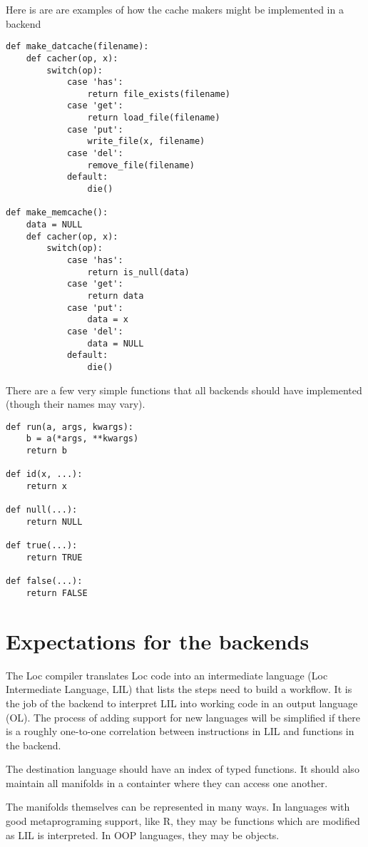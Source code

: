 \documentclass[12pt]{article}
\begin{document}
Here is are are examples of how the cache makers might be implemented in
a backend

\begin{verbatim}
def make_datcache(filename):
    def cacher(op, x):
        switch(op):
            case 'has':
                return file_exists(filename)
            case 'get':
                return load_file(filename)
            case 'put':
                write_file(x, filename)
            case 'del':
                remove_file(filename)
            default:
                die()

def make_memcache():
    data = NULL
    def cacher(op, x):
        switch(op):
            case 'has':
                return is_null(data)
            case 'get':
                return data
            case 'put':
                data = x
            case 'del':
                data = NULL
            default:
                die()
\end{verbatim}

There are a few very simple functions that all backends should have implemented
(though their names may vary).

\begin{verbatim}
def run(a, args, kwargs):
    b = a(*args, **kwargs)
    return b

def id(x, ...):
    return x

def null(...):
    return NULL

def true(...):
    return TRUE

def false(...):
    return FALSE
\end{verbatim}


\section{Expectations for the backends}

The Loc compiler translates Loc code into an intermediate language (Loc
Intermediate Language, LIL) that lists the steps need to build a workflow. It
is the job of the backend to interpret LIL into working code in an output
language (OL). The process of adding support for new languages will be
simplified if there is a roughly one-to-one correlation between instructions in
LIL and functions in the backend.

The destination language should have an index of typed functions. It should
also maintain all manifolds in a containter where they can access one another.

The manifolds themselves can be represented in many ways. In languages with
good metaprograming support, like R, they may be functions which are modified
as LIL is interpreted. In OOP languages, they may be objects.
\end{document}
